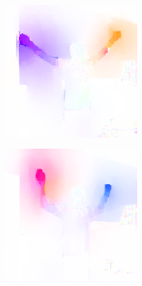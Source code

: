 \begin{figure}[!ht]
\begin{subfigure}[b]{0.244\textwidth}
        \caption{}
        \label{fig:optical-flow-b}
    \end{subfigure}
    \begin{subfigure}[b]{0.244\textwidth}
        \includegraphics[width=\linewidth]{figures/optical_flow/flow000001127.png}
        \caption{}
        \label{fig:optical-flow-c}
    \end{subfigure}
    \begin{subfigure}[b]{0.244\textwidth}
        \includegraphics[width=\linewidth]{figures/optical_flow/flow000001664.png}

\end{subfigure}
\end{figure}
